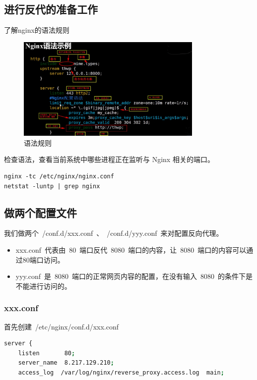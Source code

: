 \documentclass[12pt, a4paper]{article} %
\renewcommand{\figurename}{图} %
\renewcommand{\lstlistingname}{代码} %
\begin{document}
\begin{CJK*}{UTF8}{gbsn}
\subsection{进行反代的准备工作}

了解nginx的语法规则
\renewcommand{\figurename}{图} %
\begin{figure}[htbp]
    \centering
    \includegraphics[width=0.8\textwidth]{./imgs/catch2023-08-25-00.46.05.png}
    \caption{语法规则}
\end{figure}

检查语法，查看当前系统中哪些进程正在监听与 Nginx 相关的端口。
\begin{lstlisting}
nginx -tc /etc/nginx/nginx.conf
netstat -luntp | grep nginx
\end{lstlisting}

\subsection{做两个配置文件}
我们做两个~/conf.d/xxx.conf~、~/conf.d/yyy.conf~来对配置反向代理。
\begin{itemize}
    \item xxx.conf~代表由~80~端口反代~8080~端口的内容，让~8080~端口的内容可以通过80端口访问。
    \item yyy.conf~是~8080~端口的正常网页内容的配置，在没有输入~8080~的条件下是不能进行访问的。
\end{itemize}

\subsubsection{xxx.conf}
首先创建~/etc/nginx/conf.d/xxx.conf~
\renewcommand{\lstlistingname}{配置代码} %
\begin{lstlisting}[language=bash, caption=xxx.conf]
server {
    listen       80;
    server_name  8.217.129.210;
    access_log  /var/log/nginx/reverse_proxy.access.log  main;


\end{lstlisting}
\end{CJK*}
\end{document}
